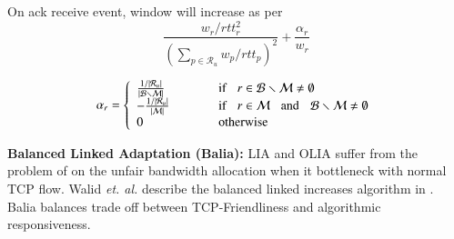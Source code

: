 On ack receive event, window will increase as per
\begin{equation}
\frac{w_r/rtt_r^2}{\left( \sum_{p\in\mathcal{R}_u}w_p/rtt_p\right)^2} + \frac{\alpha_r}{w_r}
\end{equation}

\begin{equation}
\alpha_r = \left\lbrace 
\begin{array}{ll}
\frac{1/|\mathcal{R}_u|}{|\mathcal{B}\smallsetminus \mathcal{M}|}  &\mbox{if} \hspace{0.3cm} r \in \mathcal{B}\smallsetminus\mathcal{M}\neq\emptyset   \\
- \frac{1/|\mathcal{R}_u|}{|\mathcal{M}|} \hspace{1cm}&\mbox{if} \hspace{0.3cm} r \in \mathcal{M} \hspace{0.3cm}\mbox{and}\hspace{0.3cm}\mathcal{B}\smallsetminus\mathcal{M}\neq \emptyset \\
0 & \mbox{otherwise}
\end{array} \right. 
\end{equation}


\textbf{Balanced Linked Adaptation (Balia):}
LIA and OLIA  suffer from the problem of on the unfair bandwidth allocation when it bottleneck with normal TCP flow. Walid \textit{et. al.} describe the balanced linked increases algorithm in \cite{walid2015balanced}. Balia balances trade off between TCP-Friendliness and algorithmic responsiveness.




